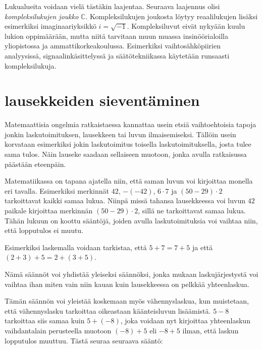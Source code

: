 Lukualueita voidaan vielä tästäkin laajentaa. Seuraava laajennus olisi \emph{kompleksilukujen joukko} $\mathbb{C}$. Kompleksilukujen joukosta löytyy reaalilukujen lisäksi
esimerkiksi imaginaariyksikkö $i = \sqrt{-1}$.
Kompleksiluvut eivät nykyään kuulu lukion oppimäärään, mutta
niitä tarvitaan muun muassa insinöörialoilla yliopistossa ja ammattikorkeakoulussa. Esimerkiksi vaihtosähköpiirien analyysissä, signaalinkäsittelyssä ja säätötekniikassa käytetään runsaasti kompleksilukuja. 

\section{lausekkeiden sieventäminen}

Matemaattisia ongelmia ratkaistaessa kannattaa usein etsiä vaihtoehtoisia tapoja jonkin laskutoimituksen, lausekkeen tai luvun ilmaisemiseksi. Tällöin usein korvataan esimerkiksi jokin laskutoimitus toisella laskutoimituksella, josta tulee sama tulos. Näin lauseke saadaan sellaiseen muotoon, jonka avulla ratkaisussa päästään eteenpäin.

Matematiikassa on tapana ajatella niin, että saman luvun voi kirjoittaa monella eri tavalla. Esimerkiksi merkinnät $42$, $-(-42)$, $6\cdot 7$ ja $(50-29)\cdot 2$ tarkoittavat kaikki samaa lukua. Niinpä missä tahansa lausekkeessa voi luvun $42$ paikale kirjoittaa merkinnän $(50-29)\cdot 2$, sillä ne tarkoittavat samaa lukua. Tähän lukuun on koottu sääntöjä, joiden avulla laskutoimituksia voi vaihtaa niin, että lopputulos ei muutu.


Esimerkiksi laskemalla voidaan tarkistaa, että $5+7=7+5$ ja että $(2+3)+5=2+(3+5)$.

Nämä säännöt voi yhdistää yleiseksi säännöksi, jonka mukaan laskujärjestystä voi vaihtaa ihan miten vain niin kauan kuin lausekkeessa on pelkkää yhteenlaskua.

Tämän säännön voi yleistää koskemaan myös vähennyslaskua, kun muistetaan, että vähennyslasku tarkoittaa oikeastaan käänteisluvun lisäämistä. $5-8$ tarkoittaa siis samaa kuin $5+(-8)$, joka voidaan nyt kirjoittaa yhteenlaskun vaihdantalain perusteella muotoon $(-8)+5$ eli $-8+5$ ilman, että laskun lopputulos muuttuu. Tästä seuraa seuraava sääntö:

